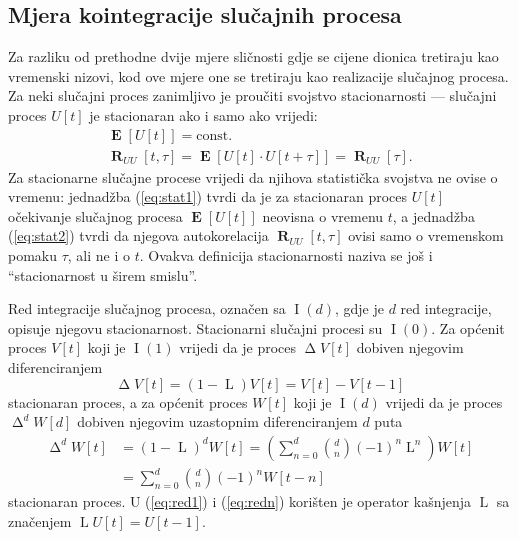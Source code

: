 \documentclass[lmodern, utf8, diplomski, numeric]{fer}
\newcommand{\E}[1]{\operatorname{\mathbf{E}}\q[#1\w]}
\newcommand{\R}[2]{\operatorname{\mathbf{R}}_{#1}\q[#2\w]}
\newcommand{\I}[1]{\operatorname{\mathrm{I}}\q(#1\w)}
\newcommand{\diff}{\operatorname{\mathrm{\Delta}}}
\newcommand{\diffn}[1]{\operatorname{\mathrm{\Delta}}^d}
\newcommand{\lag}{\operatorname{\mathrm{L}}}
\newcommand{\q}{\left}
\newcommand{\w}{\right}
\begin{document}
  \subsection{Mjera kointegracije slučajnih procesa}
  Za razliku od prethodne dvije mjere sličnosti gdje se cijene dionica tretiraju kao vremenski nizovi, kod ove mjere one se tretiraju kao realizacije slučajnog procesa.
  Za neki slučajni proces zanimljivo je proučiti svojstvo stacionarnosti --- slučajni proces $U\q[t\w]$ je stacionaran ako i samo ako vrijedi:
  \begin{gather}
  \label{eq:stat1}
  \E{U\q[t\w]} = \mathrm{const.}\\
  \label{eq:stat2}
  \R{UU}{t, \tau} = \E{U\q[t\w] \cdot U\q[t + \tau\w]} = \R{UU}{\tau}.
  \end{gather}
  Za stacionarne slučajne procese vrijedi da njihova statistička svojstva ne ovise o vremenu:
  jednadžba (\ref{eq:stat1}) tvrdi da je za stacionaran proces $U\q[t\w]$ očekivanje slučajnog procesa $\E{U\q[t\w]}$ neovisna o vremenu $t$, a jednadžba (\ref{eq:stat2}) tvrdi da njegova autokorelacija $\R{UU}{t, \tau}$ ovisi samo o vremenskom pomaku $\tau$, ali ne i o $t$.
  Ovakva definicija stacionarnosti naziva se još i ``stacionarnost u širem smislu''.
  
  Red integracije slučajnog procesa, označen sa $\I{d}$, gdje je $d$ red integracije, opisuje njegovu stacionarnost.
  Stacionarni slučajni procesi su $\I{0}$.
  Za općenit proces $V\q[t\w]$ koji je $\I{1}$ vrijedi da je proces $\diff V\q[t\w]$ dobiven njegovim diferenciranjem
  \begin{equation}
  \label{eq:red1}
  \diff V\q[t\w] = \q(1 - \lag\w) V\q[t\w] = V\q[t\w] - V\q[t - 1\w]
  \end{equation}
  stacionaran proces, a za općenit proces $W\q[t\w]$ koji je $\I{d}$ vrijedi da je proces $\diffn{d} W\q[d\w]$ dobiven njegovim uzastopnim diferenciranjem $d$ puta
  \begin{align}
  \diffn{d} W\q[t\w] &= \q(1 - \lag\w)^d W\q[t\w] = \q( \sum_{n = 0}^{d} \binom{d}{n} \q(-1\w)^n\lag^n \w) W\q[t\w] \nonumber \\
  \label{eq:redn}
  &= \sum_{n = 0}^{d} \binom{d}{n} \q(-1\w)^n W\q[t - n\w]
  \end{align}
  stacionaran proces.
  U (\ref{eq:red1}) i (\ref{eq:redn}) korišten je operator kašnjenja $\lag$ sa značenjem $\lag U\q[t\w] = U\q[t - 1\w]$.
  
\end{document}
